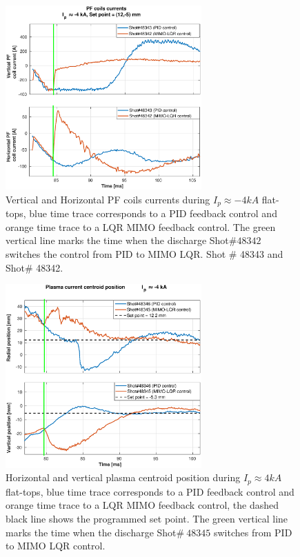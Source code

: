 \begin{figure}
	\centering
	\includegraphics[width=0.67\textwidth]{Chp5/PIDvsMIMO_343_342_curr_2.eps}
	\caption{ Vertical and Horizontal PF coils currents during  $I_p\approx -4kA$  flat-tops, blue time trace corresponds to a PID feedback control and orange time trace to a LQR MIMO feedback control. The green vertical line marks the time  when the  discharge Shot$\# 48342$ switches the control from PID to MIMO LQR. Shot $\#$ 48343 and Shot$\#$ 48342.}
\end{figure}

\begin{figure}
	\centering
	\includegraphics[width=0.67\textwidth]{Chp5/PIDvsMIMO_346_345_2.eps}
	\caption{Horizontal and vertical plasma centroid position during  $I_p\approx 4kA$  flat-tops, blue time trace corresponds to a PID feedback control and orange time trace to a LQR MIMO feedback control, the dashed black line shows the programmed set point. The green vertical line marks the time  when the  discharge Shot$\# ~48345$ switches  from PID to MIMO LQR control.}
\end{figure}

